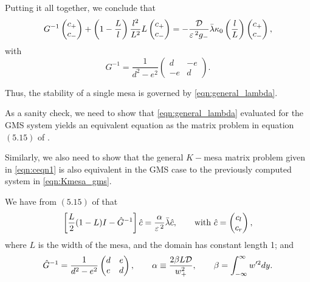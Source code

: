 Putting it all together, we conclude that
% 
\begin{equation}
\label{eqn:general_lambda}
  G^{-1}\begin{pmatrix} c_+\\c_- \end{pmatrix} + \left(1-\frac{L}{l} \right)\frac{l^2}{L^2}L\begin{pmatrix} c_+\\c_- \end{pmatrix} = - \frac{\mathcal{D}}{\varepsilon\,^2g_-}\bar{\lambda}\kappa_0\left(\frac{l}{L}\right)\begin{pmatrix} c_+\\c_- \end{pmatrix},
\end{equation}
% 
with 
% 
\[
  G^{-1} = \frac{1}{d^2-e^2}\begin{pmatrix} d&-e\\-e&d \end{pmatrix}.
\]
%

Thus, the stability of a single mesa is governed by \eqref{eqn:general_lambda}. 

\begin{remark}
As a sanity check, we need to show that \eqref{eqn:general_lambda} evaluated for the GMS system yields an equivalent equation as the matrix problem in equation $(5.15)$ of \cite{kolokolnikov_stability_2005}. 

Similarly, we also need to show that the general $K-$mesa matrix problem given in \eqref{eqn:ceqn1} is also equivalent in the GMS case to the previously computed system in \eqref{eqn:Kmesa_gms}.
\end{remark}

We have from $(5.15)$ of \cite{kolokolnikov_stability_2005} that
% 
\begin{equation}
\label{eqn:lam_old}
  \left[\frac{L}{2}(1-L)I-\hat{G}^{-1} \right]\hat{c}=\frac{\alpha}{\varepsilon\,^2}\bar{\lambda}\hat{c},\qquad\text{with }\hat{c} = \begin{pmatrix} c_l\\c_r \end{pmatrix},
\end{equation}
% 
where $L$ is the width of the mesa, and the domain has constant length 1; and
% 
\[
  \hat{G}^{-1} = \frac{1}{d^2-e^2}\begin{pmatrix} d&e\\e&d \end{pmatrix},\qquad \alpha\equiv\frac{2\beta L\mathcal{D}}{w_+^2},\qquad \beta = \int_{-\infty}^{\infty}w'^2dy.
\]
%

